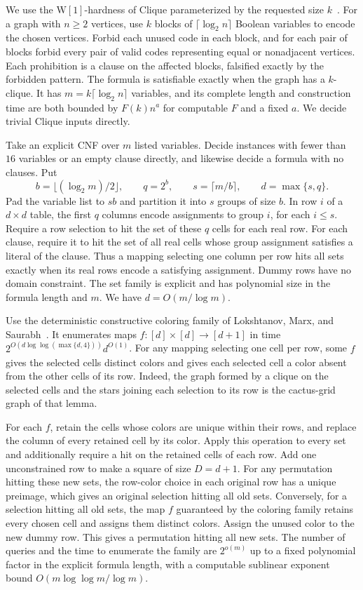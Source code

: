\documentclass[11pt]{article}
\begin{document}
We use the \(\mathrm{W[1]}\)-hardness of Clique parameterized by the requested
size \(k\)~\cite{df}. For a graph with \(n\ge 2\) vertices, use \(k\) blocks of
\(\lceil\log_2 n\rceil\) Boolean variables to encode the chosen vertices.
Forbid each unused code in each block, and for each pair of blocks forbid every
pair of valid codes representing equal or nonadjacent vertices. Each prohibition
is a clause on the affected blocks, falsified exactly by the forbidden pattern.
The formula is satisfiable exactly when the graph has a \(k\)-clique. It has
\(m=k\lceil\log_2 n\rceil\) variables, and its complete length and construction
time are both bounded by \(F(k)n^a\) for computable \(F\) and a fixed \(a\).
We decide trivial Clique inputs directly.

Take an explicit CNF over \(m\) listed variables. Decide instances with fewer
than \(16\) variables or an empty clause directly, and likewise decide a
formula with no clauses. Put
\[
 b=\lfloor (\log_2 m)/2\rfloor,\qquad
 q=2^b,\qquad s=\lceil m/b\rceil,\qquad d=\max\{s,q\}.
\]
Pad the variable list to \(sb\) and partition it into \(s\) groups of size
\(b\). In row \(i\) of a \(d\times d\) table, the first \(q\) columns encode
assignments to group \(i\), for each \(i\le s\). Require a row selection to
hit the set of these \(q\) cells for each real row. For each clause, require
it to hit the set of all real cells whose group assignment satisfies a
literal of the clause. Thus a mapping selecting one column per row hits all
sets exactly when its real rows encode a satisfying assignment. Dummy
rows have no domain constraint. The set family is explicit and has polynomial
size in the formula length and \(m\). We have \(d=O(m/\log m)\).

Use the deterministic constructive coloring family of Lokshtanov, Marx, and
Saurabh~\cite[Lemma 2.8 and its proof]{lms}. It enumerates maps
\(f\colon[d]\times[d]\to[d+1]\) in time
\(2^{O(d\log\log(\max\{d,4\}))}d^{O(1)}\). For any mapping selecting one cell
per row, some \(f\) gives the selected cells distinct colors and gives each
selected cell a color absent from the other cells of its row. Indeed, the
graph formed by a clique on the selected cells and the stars joining each
selection to its row is the cactus-grid graph of that lemma.

For each \(f\), retain the cells whose colors are unique within their rows, and
replace the column of every retained cell by its color. Apply this operation to
every set and additionally require a hit on the retained cells of each row.
Add one unconstrained row to make a square of size \(D=d+1\).
For any permutation hitting these new sets, the row-color choice in each
original row has a unique preimage, which gives an original selection hitting
all old sets. Conversely, for a selection hitting all old sets, the map
\(f\) guaranteed by the coloring family retains every chosen cell and assigns
them distinct colors. Assign the unused color to the new dummy row. This
gives a permutation hitting all new sets. The number of queries and the time
to enumerate the family are \(2^{o(m)}\) up to a fixed polynomial factor in
the explicit formula length, with a computable sublinear exponent bound
\(O(m\log\log m/\log m)\).
\end{document}
